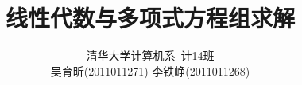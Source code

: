 \documentclass[a4paper]{article}
\title{线性代数与多项式方程组求解}
\author{\small 清华大学计算机系~计14班 \\\small 吴育昕(2011011271) 李铁峥(2011011268)}
\date{}
\begin{document}
\maketitle

\tableofcontents
\nocite{adv_alg}\nocite{ideals}\nocite{using}\nocite{lc}\nocite{poly_alg}





\printbibliography
%
\end{document}

